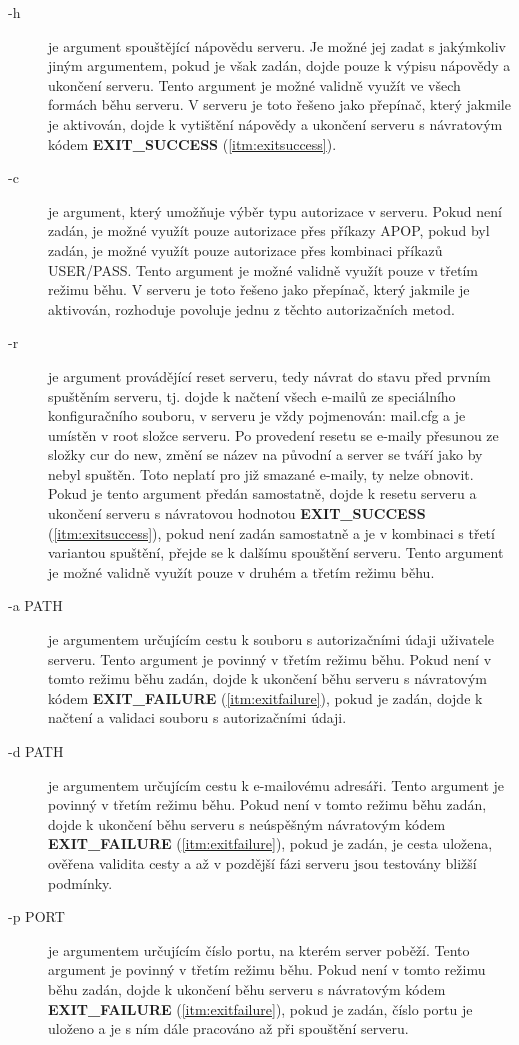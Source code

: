 \documentclass[11pt,a4paper]{report}
\begin{document}
    \begin{description}
        \item [-h] \label{itm:help} je argument spouštějící nápovědu serveru. Je možné jej zadat s jakýmkoliv jiným argumentem, pokud je však zadán, dojde pouze k výpisu nápovědy a ukončení serveru. Tento argument je možné validně využít ve všech formách běhu serveru.
        V serveru je toto řešeno jako přepínač, který jakmile je aktivován, dojde k vytištění nápovědy a ukončení serveru s návratovým kódem \textbf{EXIT\_SUCCESS} (\ref{itm:exitsuccess}).
        \item [-c] \label{itm:authorisation}je argument, který umožňuje výběr typu autorizace v serveru. Pokud není zadán, je možné využít pouze autorizace přes příkazy APOP, pokud byl zadán, je možné využít pouze autorizace přes kombinaci příkazů USER/PASS. Tento argument je možné validně využít pouze v třetím režimu běhu.
        V serveru je toto řešeno jako přepínač, který jakmile je aktivován, rozhoduje povoluje jednu z těchto autorizačních metod.
        \item [-r] \label{itm:reset}je argument provádějící reset serveru, tedy návrat do stavu před prvním spuštěním serveru, tj. dojde k načtení všech e-mailů ze speciálního konfiguračního souboru, v serveru je vždy pojmenován: mail.cfg a je umístěn v root složce serveru. Po provedení resetu se e-maily přesunou ze složky cur do new, změní se název na původní a server se tváří jako by nebyl spuštěn. Toto neplatí pro již smazané e-maily, ty nelze obnovit. Pokud je tento argument předán samostatně, dojde k resetu serveru a ukončení serveru s návratovou hodnotou \textbf{EXIT\_SUCCESS} (\ref{itm:exitsuccess}), pokud není zadán samostatně a je v kombinaci s třetí variantou spuštění, přejde se k dalšímu spouštění serveru. Tento argument je možné validně využít pouze v druhém a třetím režimu běhu.
        \item [-a PATH] je argumentem určujícím cestu k souboru s autorizačními údaji uživatele serveru. Tento argument je povinný v třetím režimu běhu. Pokud není v tomto režimu běhu zadán, dojde k ukončení běhu serveru s návratovým kódem \textbf{EXIT\_FAILURE} (\ref{itm:exitfailure}), pokud je zadán, dojde k načtení a validaci souboru s autorizačními údaji.
        \item [-d PATH] je argumentem určujícím cestu k e-mailovému adresáři. Tento argument je povinný v třetím režimu běhu. Pokud není v tomto režimu běhu zadán, dojde k ukončení běhu serveru s neúspěšným návratovým kódem \textbf{EXIT\_FAILURE} (\ref{itm:exitfailure}), pokud je zadán, je cesta uložena, ověřena validita cesty a až v pozdější fázi serveru jsou testovány bližší podmínky.
        \item [-p PORT] je argumentem určujícím číslo portu, na kterém server poběží. Tento argument je povinný v třetím režimu běhu. Pokud není v tomto režimu běhu zadán, dojde k ukončení běhu serveru s návratovým kódem \textbf{EXIT\_FAILURE} (\ref{itm:exitfailure}), pokud je zadán, číslo portu je uloženo a je s ním dále pracováno až při spouštění serveru.
    \end{description}
\end{document}

